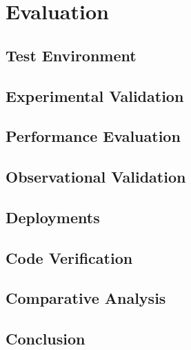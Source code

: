 \chapter{Evaluation}
\doit

\section{Test Environment}
\doit

\section{Experimental Validation}
\doit

\section{Performance Evaluation}
\doit

\section{Observational Validation}
\doit

\section{Deployments}
\doit

\section{Code Verification}
\doit

\section{Comparative Analysis}
\doit

\section{Conclusion}
\doit
